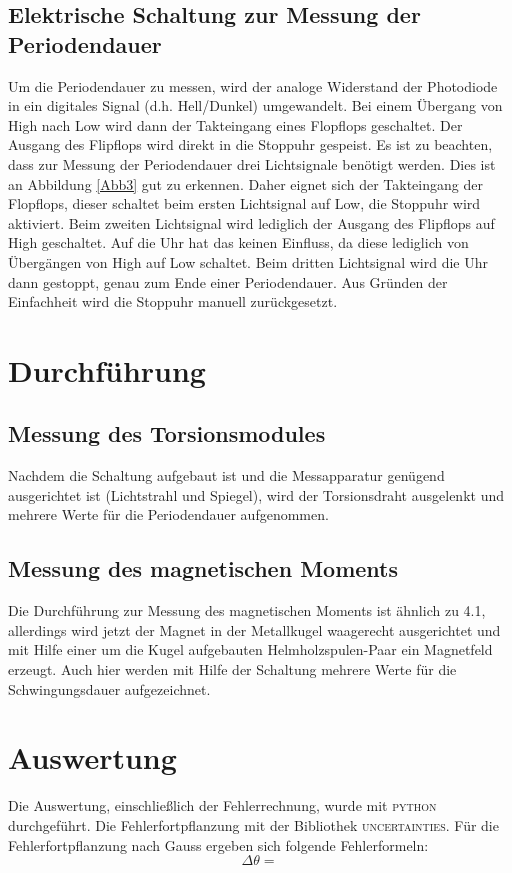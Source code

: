 \documentclass[11pt,ngerman,a4paper]{article}
\begin{document}
\subsection{Elektrische Schaltung zur Messung der Periodendauer}
Um die Periodendauer zu messen, wird der analoge Widerstand der Photodiode in ein digitales Signal (d.h. Hell/Dunkel) umgewandelt. Bei einem Übergang von High nach Low wird dann der Takteingang eines Flopflops geschaltet. Der Ausgang des Flipflops wird direkt in die Stoppuhr gespeist. Es ist zu beachten, dass zur Messung der Periodendauer drei Lichtsignale benötigt werden. Dies ist an Abbildung \ref{Abb3} gut zu erkennen. Daher eignet sich der Takteingang der Flopflops, dieser schaltet beim ersten Lichtsignal auf Low, die Stoppuhr wird aktiviert. Beim zweiten Lichtsignal wird lediglich der Ausgang des Flipflops auf High geschaltet. Auf die Uhr hat das keinen Einfluss, da diese lediglich von Übergängen von High auf Low schaltet. Beim dritten Lichtsignal wird die Uhr dann gestoppt, genau zum Ende einer Periodendauer. Aus Gründen der Einfachheit wird die Stoppuhr manuell zurückgesetzt.
\section{Durchführung}
\subsection{Messung des Torsionsmodules}
Nachdem die Schaltung aufgebaut ist und die Messapparatur genügend ausgerichtet ist (Lichtstrahl und Spiegel), wird der Torsionsdraht ausgelenkt und mehrere Werte für die Periodendauer aufgenommen.
\subsection{Messung des magnetischen Moments}
Die Durchführung zur Messung des magnetischen Moments ist ähnlich zu 4.1, allerdings wird jetzt der Magnet in der Metallkugel waagerecht ausgerichtet und mit Hilfe einer um die Kugel aufgebauten Helmholzspulen-Paar ein Magnetfeld erzeugt. Auch hier werden mit Hilfe der Schaltung mehrere Werte für die Schwingungsdauer aufgezeichnet.
\section{Auswertung}
Die Auswertung, einschließlich der Fehlerrechnung, wurde mit \textsc{python} durchgeführt. Die Fehlerfortpflanzung mit der Bibliothek \textsc{uncertainties}. Für die Fehlerfortpflanzung nach Gauss ergeben sich folgende Fehlerformeln:
\[
\Delta\theta = 
\]
\end{document}

